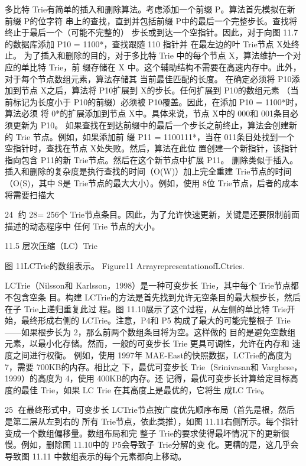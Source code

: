 多比特 Trie有简单的插入和删除算法。考虑添加一个前缀 P。算法首先模拟在新前缀 P的位字符
串上的查找，直到并包括前缀 P中的最后一个完整步长。查找将终止于最后一个（可能不完整的）
步长或到达一个空指针。因此，对于向图 11.7 的数据库添加 P10 = 1100*，查找跟随 110 指针并
在最左边的叶 Trie节点 X处终止。
为了插入和删除的目的，对于多比特 Trie 中的每个节点 X，算法维护一个对应的单比特 Trie，前
缀存储在 X 中。这个辅助结构不需要在高速内存中。此外，对于每个节点数组元素，算法存储其
当前最佳匹配的长度。
在确定必须将 P10添加到节点 X之后，算法将 P10扩展到 X的步长。任何扩展到 P10的数组元素
（当前标记为长度小于 P10的前缀）必须被 P10覆盖。因此，在添加 P10 = 1100*时，算法必须
将 0*的扩展添加到节点 X中。具体来说，节点 X中的 000和 001条目必须更新为 P10。
如果查找在到达前缀中的最后一个步长之前终止，算法会创建新的 Trie 节点。例如，如果添加前
缀 P11 = 1100111*，当在 011条目处找到一个空指针时，查找在节点 X处失败。然后，算法在此位
置创建一个新指针，该指针指向包含 P11的新 Trie节点。然后在这个新节点中扩展 P11。
删除类似于插入。插入和删除的复杂度是执行查找的时间（O(W)）加上完全重建 Trie节点的时间
（O(S)，其中 S是 Trie节点的最大大小）。例如，使用 8位 Trie节点，后者的成本将需要扫描大

                                                                                       24
约 28= 256个 Trie节点条目。因此，为了允许快速更新，关键是还要限制前面描述的动态程序中
任何 Trie 节点的大小。



11.5 层次压缩（LC）Trie




                        图 11LCTrie的数组表示。
                 Figure11 ArrayrepresentationofLCtries.



LCTrie（Nilsson和 Karlsson，1998）是一种可变步长 Trie，其中每个 Trie节点都不包含空条
目。构建 LCTrie的方法是首先找到允许无空条目的最大根步长，然后在子 Trie上递归重复此过
程。图 11.10展示了这个过程，从左侧的单比特 Trie开始，最终形成右侧的 LCTrie。注意，P4和
P5 构成了最大的可能完整根子 Trie——如果根步长为 2，那么前两个数组条目将为空。这样做的
目的是避免空数组元素，以最小化存储。然而，一般的可变步长 Trie 更具可调性，允许在内存和
速度之间进行权衡。
例如，使用 1997年 MAE-East的快照数据，LCTrie的高度为 7，需要 700KB的内存。相比之
下，最优可变步长 Trie（Srinivasan和 Varghese，1999）的高度为 4，使用 400KB的内存。还
记得，最优可变步长计算给定目标高度的最佳 Trie，如果 LC Trie 在其高度上是最优的，它将生
成LC Trie。

                                                          25
在最终形式中，可变步长 LCTrie节点按广度优先顺序布局（首先是根，然后是第二层从左到右的
所有 Trie节点，依此类推），如图 11.11右侧所示。每个指针变成一个数组偏移量。数组布局和完
整子 Trie的要求使得最坏情况下的更新很慢。例如，删除图 11.10中的 P5会导致子 Trie分解的变
化。更糟的是，这几乎会导致图 11.11 中数组表示的每个元素都向上移动。



